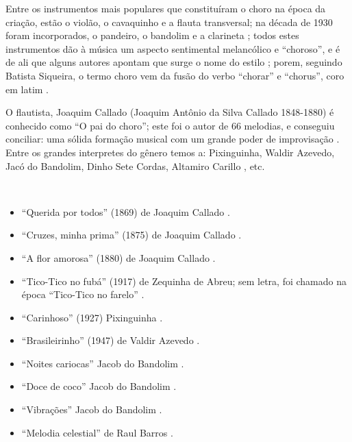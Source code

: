 Entre os instrumentos mais populares que constituíram o choro na época da criação, 
estão o violão, o cavaquinho e a flauta transversal;
na década de 1930 foram incorporados, o pandeiro, o bandolim e a clarineta \cite[pp. 64]{reinato2010musica} \cite[pp. 79]{dourado2004dicionario} \cite[pp. 132]{perna2002samba};
todos estes instrumentos dão à música um aspecto sentimental melancólico e ``choroso'', e
é de ali que alguns autores apontam que surge o nome do estilo \cite[pp. 132]{perna2002samba};
porem, seguindo Batista Siqueira, 
o termo choro vem da fusão do verbo ``chorar'' e ``chorus'', coro em latim \cite[pp. 13]{diniz2003almanaque}.

O flautista, Joaquim Callado (Joaquim Antônio da Silva Callado 1848-1880) 
é conhecido como ``O pai do choro'';
este foi o autor de 66 melodias, e conseguiu conciliar: 
uma sólida formação musical com um grande poder de improvisação  \cite[pp. 15]{diniz2003almanaque} \cite[pp. 64]{reinato2010musica}.
Entre os grandes interpretes do gênero temos a:
Pixinguinha, Waldir Azevedo, Jacó do Bandolim, Dinho Sete Cordas, Altamiro Carillo \cite[pp. 79]{dourado2004dicionario}, etc.

\begin{example} ~

\begin{itemize}
\item ``Querida por todos'' (1869) de Joaquim Callado \cite[pp. 15]{diniz2003almanaque} \cite[pp. 1089]{marcondes1977enciclopediav2}.
\item ``Cruzes, minha prima'' (1875) de Joaquim Callado \cite[pp. 15]{diniz2003almanaque} \cite[pp. 951]{marcondes1977enciclopediav2}.
\item ``A flor amorosa'' (1880) de Joaquim Callado \cite[pp. 8]{livingston2005choro} \cite[pp. 15]{diniz2003almanaque}  \cite[pp. 985]{marcondes1977enciclopediav2}.
\item ``Tico-Tico no fubá'' (1917) de Zequinha de Abreu; sem letra, foi chamado na época ``Tico-Tico no farelo'' \cite[pp. 6]{marcondes1998enciclopedia} \cite[pp. 39,91]{diniz2003almanaque}.
\item ``Carinhoso'' (1927) Pixinguinha   \cite[pp. 133]{perna2002samba}.
\item ``Brasileirinho'' (1947) de Valdir Azevedo  \cite[pp. 133]{perna2002samba}.
\item ``Noites cariocas'' Jacob do Bandolim \cite{diniz2003almanaque}.
\item ``Doce de coco'' Jacob do Bandolim \cite{diniz2003almanaque}.
\item ``Vibrações'' Jacob do Bandolim \cite{diniz2003almanaque}.
\item ``Melodia celestial'' de Raul Barros \cite[pp. 130]{livingston2005choro}.
\end{itemize}
\end{example}


